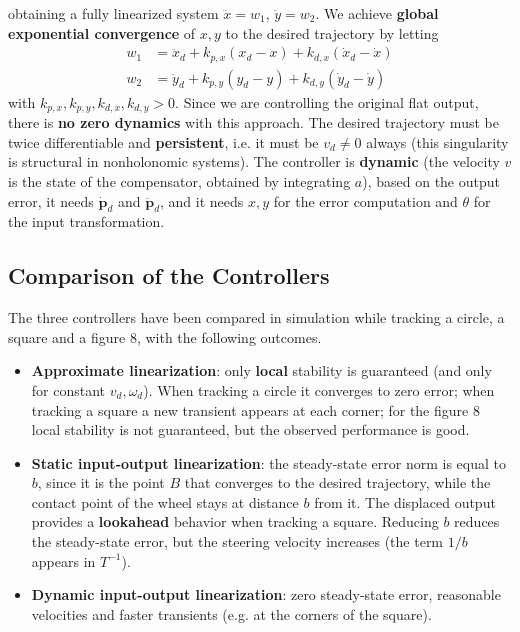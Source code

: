 \documentclass[10pt, a4paper]{report}
\begin{document}
obtaining a fully linearized system $\ddot x=w_1$, $\ddot y=w_2$. We achieve \textbf{global exponential convergence} of $x,y$ to the desired trajectory by letting\begin{align}
    w_1&=\ddot x_d+k_{p,x}(x_d-x)+k_{d,x}(\dot x_d-\dot x)\\
    w_2&=\ddot y_d+k_{p,y}(y_d-y)+k_{d,y}(\dot y_d-\dot y)
\end{align}
with $k_{p,x},k_{p,y},k_{d,x},k_{d,y}>0$. Since we are controlling the original flat output, there is \textbf{no zero dynamics} with this approach. The desired trajectory must be twice differentiable and \textbf{persistent}, i.e. it must be $v_d\neq 0$ always (this singularity is structural in nonholonomic systems). The controller is \textbf{dynamic} (the velocity $v$ is the state of the compensator, obtained by integrating $a$), based on the output error, it needs $\dot{\mathbf p}_d$ and $\ddot{\mathbf p}_d$, and it needs $x,y$ for the error computation and $\theta$ for the input transformation.
\subsection{Comparison of the Controllers}
The three controllers have been compared in simulation while tracking a circle, a square and a figure 8, with the following outcomes.
\begin{itemize}
    \item \textbf{Approximate linearization}: only \textbf{local} stability is guaranteed (and only for constant $v_d,\omega_d$). When tracking a circle it converges to zero error; when tracking a square a new transient appears at each corner; for the figure 8 local stability is not guaranteed, but the observed performance is good.
    \item \textbf{Static input-output linearization}: the steady-state error norm is equal to $b$, since it is the point $B$ that converges to the desired trajectory, while the contact point of the wheel stays at distance $b$ from it. The displaced output provides a \textbf{lookahead} behavior when tracking a square. Reducing $b$ reduces the steady-state error, but the steering velocity increases (the term $1/b$ appears in $T^{-1}$).
    \item \textbf{Dynamic input-output linearization}: zero steady-state error, reasonable velocities and faster transients (e.g. at the corners of the square).
\end{itemize}
\end{document}
